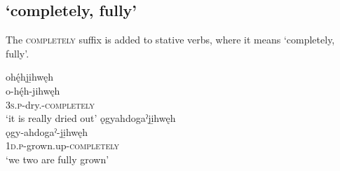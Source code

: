 \subsection{ ‘completely, fully’} \label{[-jihwęh] ‘completely, fully’}
The  \textsc{completely} suffix is added to stative verbs, where it means ‘completely, fully’.
 
\ea\label{ex:causinex30}
\ea ohę́hji̱hwęh\\
\gll o-hę́h-jihwęh\\
 \textsc{3s.p}-dry.{\stative}-\textsc{completely}\\
\glt `it is really dried out'
\ex ǫgyahdogaˀji̱hwęh\\
\gll ǫgy-ahdogaˀ-ji̱hwęh\\
 \textsc{1d.p}-grown.up-\textsc{completely}\\
\glt `we two are fully grown'
\z
\z

